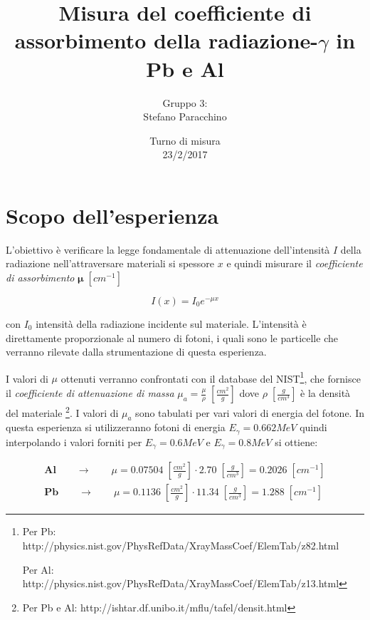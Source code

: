\documentclass[12pt,a4paper,openright,twoside]{article}
\title{\textbf{Misura del coefficiente di assorbimento della radiazione-$\gamma$ in Pb e Al}}
\date{\small{ Turno di misura\\
	23/2/2017}}
\author{Gruppo 3: \\  
		Stefano Paracchino 
		}
\numberwithin{equation}{section} %
\begin{document}
\maketitle
    

\tableofcontents                        %

\pagebreak
\section{Scopo dell'esperienza}
L'obiettivo è verificare la legge fondamentale di attenuazione dell'intensità $I$ della radiazione nell'attraversare materiali si spessore $x$ e quindi misurare il \textit{coefficiente di assorbimento} $\mathbf{ \mu} \; [cm^{-1}]$

\begin{equation} \label{ass}
I(x)=I_0 e^{- \mu x}
\end{equation}

con $I_0$ intensità della radiazione incidente sul materiale.
L'intensità è direttamente proporzionale al numero di fotoni, i quali sono le particelle che verranno rilevate dalla strumentazione di questa esperienza.

I valori di $\mu $ ottenuti verranno confrontati con il database del NIST\footnote{Per Pb: http://physics.nist.gov/PhysRefData/XrayMassCoef/ElemTab/z82.html

Per Al:  http://physics.nist.gov/PhysRefData/XrayMassCoef/ElemTab/z13.html}, che fornisce il \textit{coefficiente di attenuazione di massa} $\mu_a =\frac{\mu}{\rho} \; [\frac{cm^2}{g}] $ dove $\rho \; [\frac{g}{cm^3}] $ è la densità del materiale \footnote{Per Pb e Al: http://ishtar.df.unibo.it/mflu/tafel/densit.html}.
I valori di $\mu_a$ sono tabulati per vari valori di energia del fotone. In questa esperienza si utilizzeranno fotoni di energia $E_{\gamma}=0.662 MeV$ quindi interpolando i valori forniti per $E_{\gamma}=0.6 MeV$ e $E_{\gamma}=0.8 MeV$ si ottiene:

\begin{gather}
\mathbf{Al} \qquad \rightarrow \qquad \mu = 0.07504 \; [\frac{cm^2}{g}] \cdot 2.70 \; [\frac{g}{cm^3}] = \boxed{ 0.2026 \; [cm^{-1}]} \\
\mathbf{Pb} \qquad \rightarrow \qquad \mu = 0.1136 \; [\frac{cm^2}{g}] \cdot 11.34 \; [\frac{g}{cm^3}] = \boxed{ 1.288 \; [cm^{-1}]}
\label{mu}
\end{gather}
\end{document}
